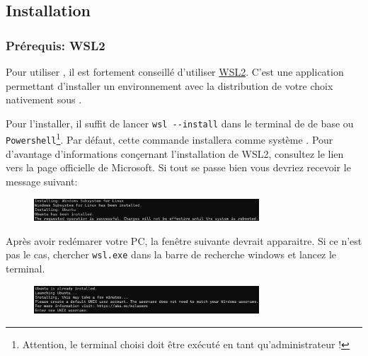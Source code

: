 \documentclass[internal]{nhitec_design}
\begin{document}
\newpage

    \subsection[Installation Windows]{Installation \windows{}\label{sec:installation_windows}}

        \subsubsection[Prérequis][fr.wikipedia.org/wiki/Windows_Subsystem_for_Linux]{Prérequis: WSL2}

        Pour utiliser \dockerdesktop, il est fortement conseillé d'utiliser \href{https://learn.microsoft.com/fr-fr/windows/wsl/install}{WSL2}. C'est une application \windows{} permettant d'installer un environnement \linux{} avec la distribution de votre choix nativement sous \windows{}. 

        Pour l'installer, il suffit de lancer \verb|wsl --install| dans le terminal de \windows{} de base ou \texttt{Powershell}\footnote{Attention, le terminal choisi doit être exécuté en tant qu'administrateur !}. Par défaut, cette commande installera \ubuntu{} comme système \linux. Pour d'avantage d'informations conçernant l'installation de WSL2, consultez le lien vers la page officielle de Microsoft. Si tout se passe bien vous devriez recevoir le message suivant:

        \begin{figure}[!th]
            \centering
            \includegraphics[width=0.75\textwidth]{Images_formation/ubuntu_installation.pdf}
        \end{figure}

        Après avoir redémarer votre PC, la fenêtre suivante devrait apparaitre. Si ce n'est pas le cas, chercher \texttt{wsl.exe} dans la barre de recherche windows et lancez le terminal.

        \begin{figure}[!th]
            \centering
            \includegraphics[width=0.75\textwidth]{Images_formation/user_creation.pdf}
        \end{figure}
\end{document}
